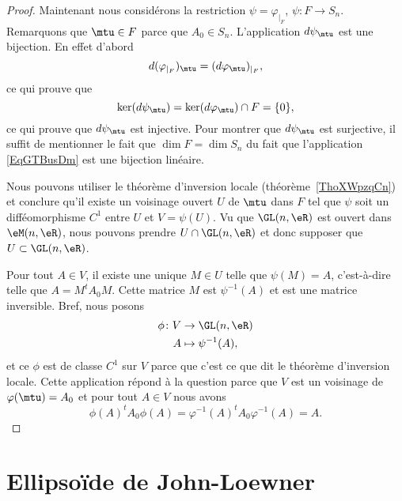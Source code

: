 \begin{proof}
	Maintenant nous considérons la restriction \( \psi=\varphi_{|_F}\), \( \psi\colon F\to S_n\). Remarquons que \( \mtu\in F\) parce que \( A_0\in S_n\). L'application \( d\psi_{\mtu}\) est une bijection. En effet d'abord
	\begin{equation}
		d(\varphi_{|_F})_{\mtu}=(d\varphi_{\mtu})_{|_F},
	\end{equation}
	ce qui prouve que
	\begin{equation}
		\ker(d\psi_{\mtu})=\ker(d\varphi_{\mtu})\cap F=\{ 0 \},
	\end{equation}
	ce qui prouve que \( d\psi_{\mtu}\) est injective. Pour montrer que \( d\psi_{\mtu}\) est surjective, il suffit de mentionner le fait que \( \dim F=\dim S_n\) du fait que l'application \eqref{EqGTBusDm} est une bijection linéaire.

	Nous pouvons utiliser le théorème d'inversion locale (théorème~\ref{ThoXWpzqCn}) et conclure qu'il existe un voisinage ouvert \( U\) de \( \mtu\) dans \( F\) tel que \( \psi\) soit un difféomorphisme \( C^1\) entre \( U\) et \( V=\psi(U)\). Vu que \( \GL(n,\eR)\) est ouvert dans \( \eM(n,\eR)\), nous pouvons prendre \( U\cap \GL(n,\eR)\) et donc supposer que \( U\subset \GL(n,\eR)\).

	Pour tout \( A\in V\), il existe une unique \( M\in U\) telle que \( \psi(M)=A\), c'est-à-dire telle que \( A=M^tA_0M\). Cette matrice \( M\) est \( \psi^{-1}(A)\) et est une matrice inversible. Bref, nous posons
	\begin{equation}
		\begin{aligned}
			\phi\colon V & \to \GL(n,\eR)        \\
			A            & \mapsto \psi^{-1}(A),
		\end{aligned}
	\end{equation}
	et ce \( \phi\) est de classe \( C^1\) sur \( V\) parce que c'est ce que dit le théorème d'inversion locale. Cette application répond à la question parce que \( V\) est un voisinage de \( \varphi(\mtu)=A_0\) et pour tout \( A\in V\) nous avons
	\begin{equation}
		\phi(A)^tA_0\phi(A)=\varphi^{-1}(A)^tA_0\varphi^{-1}(A)=A.
	\end{equation}
\end{proof}

\section{Ellipsoïde de John-Loewner}

